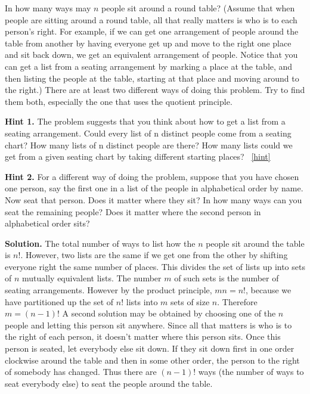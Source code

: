 \documentclass{book}
\begin{document}
\setcounter{project}{110}
\addtocounter{project}{-1}
\begin{activity}[]\label{roundtable}
\hypertarget{p-790}{}%
In how many ways may \(n\) people sit around a round table? (Assume that when people are sitting around a round table, all that really matters is who is to each person's right. For example, if we can get one arrangement of people around the table from another by having everyone get up and move to the right one place and sit back down, we get an equivalent arrangement of people. Notice that you can get a list from a seating arrangement by marking a place at the table, and then listing the people at the table, starting at that place and moving around to the right.) There are at least two different ways of doing this problem. Try to find them both, especially the one that uses the quotient principle.%
\par\smallskip%
\noindent\textbf{Hint 1.}\hypertarget{hint-63}{}\quad%
\hypertarget{p-791}{}%
The problem suggests that you think about how to get a list from a seating arrangement. Could every list of n distinct people come from a seating chart? How many lists of n distinct people are there? How many lists could we get from a given seating chart by taking different starting places?%
~\hfill{\tiny\hyperlink{a-110}{[hint]}\hypertarget{q-110}{}}\par\smallskip%
\noindent\textbf{Hint 2.}\hypertarget{hint-64}{}\quad%
\hypertarget{p-792}{}%
For a different way of doing the problem, suppose that you have chosen one person, say the first one in a list of the people in alphabetical order by name. Now seat that person. Does it matter where they sit? In how many ways can you seat the remaining people? Does it matter where the second person in alphabetical order sits?%
\par\smallskip%
\noindent\textbf{Solution.}\hypertarget{solution-73}{}\quad%
\hypertarget{p-793}{}%
The total number of ways to list how the \(n\) people sit around the table is \(n!\). However, two lists are the same if we get one from the other by shifting everyone right the same number of places. This divides the set of lists up into sets of \(n\) mutually equivalent lists. The number \(m\) of such sets is the number of seating arrangements. However by the product principle, \(mn=n!\), because we have partitioned up the set of \(n!\) lists into \(m\) sets of size \(n\). Therefore \(m=(n-1)!\) A second solution may be obtained by choosing one of the \(n\) people and letting this person sit anywhere. Since all that matters is who is to the right of each person, it doesn't matter where this person sits. Once this person is seated, let everybody else sit down. If they sit down first in one order clockwise around the table and then in some other order, the person to the right of somebody has changed. Thus there are \((n-1)!\) ways (the number of ways to seat everybody else) to seat the people around the table.%
\end{activity}
\end{document}
